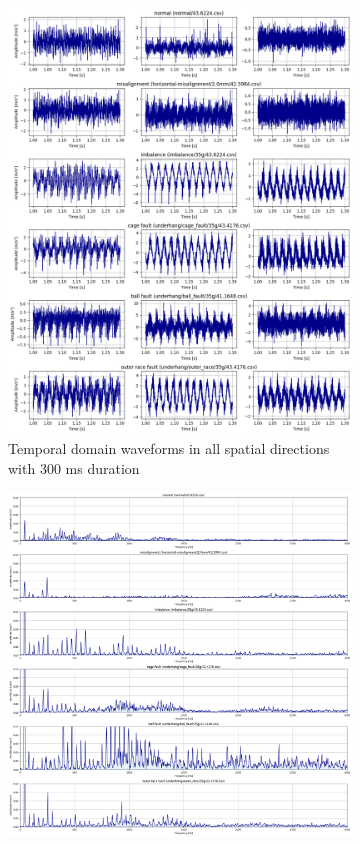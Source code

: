 \begin{figure}[ht]
    \centering
    \begin{subfigure}[b]{0.44\textwidth}
        \includegraphics[width=\textwidth]{assets/design/Mafaulda-A-time-waveform.png}
        \caption{Temporal domain waveforms in all spatial directions with 300 ms duration}
    \end{subfigure}
    \hfill
    \begin{subfigure}[b]{0.55\textwidth}
        \includegraphics[width=\textwidth]{assets/design/Mafaulda-A-spectrum-Y-axis.png}

\end{subfigure}
\end{figure}
